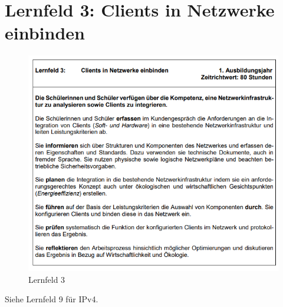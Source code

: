 \section{Lernfeld 3: Clients in Netzwerke einbinden}

\begin{figure}
    [H]
    \centering
    \includegraphics[width=\textwidth]{figures/lernfeld3.png}
    \caption{Lernfeld 3}
    \label{fig:lernfeld3}
\end{figure}

Siehe Lernfeld 9 für IPv4.